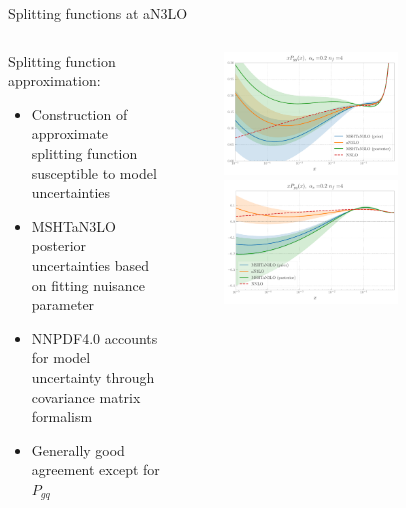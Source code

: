 \documentclass[aspectratio=169, 8pt,t]{beamer}
\begin{document}
\begin{frame}{Splitting functions at aN3LO}
  \begin{columns}[T]
    \begin{column}{0.49\textwidth}
      Splitting function approximation:
      \begin{itemize}
        \item Construction of approximate splitting function susceptible to  model uncertainties
        \item MSHTaN3LO posterior uncertainties based on fitting nuisance parameter
        \item NNPDF4.0 accounts for model uncertainty through covariance matrix formalism
        \item Generally good agreement except for $P_{gq}$
      \end{itemize}
    \end{column}
    \begin{column}{0.49\textwidth}
      \vspace*{-4em}
      \begin{figure}
        \includegraphics[width=0.7\textwidth]{figures/gamma_gg_msht_logx.pdf}\\
        \includegraphics[width=0.7\textwidth]{figures/gamma_gq_msht_logx.pdf}  
      \end{figure}
    \end{column}
  \end{columns}
\end{frame}
\end{document}
